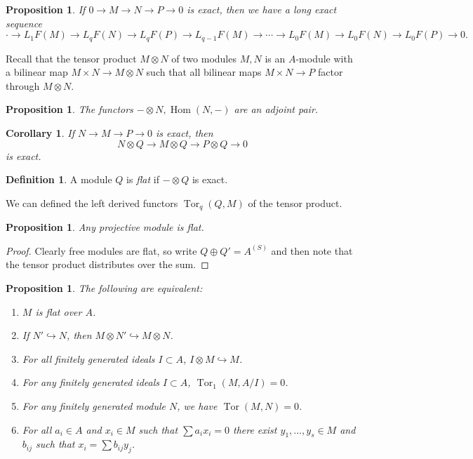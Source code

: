 \documentclass[leqno, openany]{memoir}
\newtheorem{cor}[thm]{Corollary}
\newtheorem{prop}[thm]{Proposition}
\theoremstyle{definition}
\newtheorem{defn}[thm]{Definition}
\theoremstyle{remark}
\theoremstyle{plain}
\theoremstyle{definition}
\theoremstyle{remark}
\DeclareMathOperator{\Hom}{Hom}
\begin{document}
\begin{prop} If $0 \to M \to N \to P \to 0$ is exact, then we have a long exact
    sequence \[ \cdot \to L_1F(M) \to L_qF(N) \to L_q F(P) \to L_{q-1} F(M) \to
    \cdots \to L_0 F(M) \to L_0 F(N) \to L_0 F(P) \to 0. \] \end{prop}
    
Recall that the tensor product $M \otimes N$ of two modules $M,N$ is an
$A$-module with a bilinear map $M \times N \to M \otimes N$ such that all
bilinear maps $M \times N \to P$ factor through $M \otimes N$.

\begin{prop} The functors $- \otimes N, \Hom(N,-)$ are an adjoint pair.
\end{prop}

\begin{cor} If $N \to M \to P \to 0$ is exact, then \[ N \otimes Q \to M
\otimes Q \to P \otimes Q \to 0 \] is exact.  \end{cor}

\begin{defn} A module $Q$ is \textit{flat} if $- \otimes Q$ is exact.
\end{defn}

We can defined the left derived functors $\operatorname{Tor}_q(Q,M)$ of the
tensor product.

\begin{prop} Any projective module is flat.  \end{prop}

\begin{proof} Clearly free modules are flat, so write $Q \oplus Q' = A^{(S)}$
and then note that the tensor product distributes over the sum.  \end{proof}

\begin{prop} The following are equivalent: \begin{enumerate} \item $M$ is flat
    over $A$.  \item If $N' \hookrightarrow N$, then $M \otimes N'
    \hookrightarrow M \otimes N$.  \item For all finitely generated ideals $I
    \subset A$, $I \otimes M \hookrightarrow M$.  \item For any finitely
    generated ideals $I \subset A$, $\operatorname{Tor}_1(M,A/I) = 0$.  \item
    For any finitely generated module $N$, we have $\operatorname{Tor}(M,N) =
    0$.  \item For all $a_i \in A$ and $x_i \in M$ such that $\sum a_i x_i = 0$
    there exist $y_1, \ldots, y_s \in M$ and $b_{ij}$ such that $x_i = \sum
    b_{ij} y_j$.  \end{enumerate} \end{prop}
\end{document}
